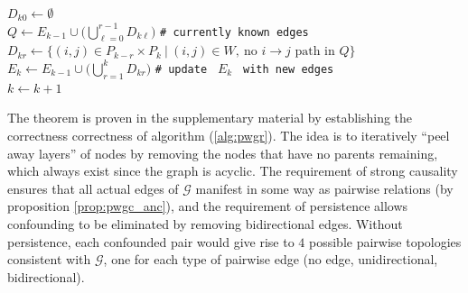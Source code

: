 \documentclass{statsoc}
\def\gcg{\mathcal{G}}  %
\begin{document}
\begin{algorithm}[H]
{    $D_{k0} \leftarrow \emptyset$\\
    {
      $Q \leftarrow E_{k - 1} \cup \big(\bigcup_{\ell = 0}^{r - 1} D_{k\ell}\big)$ \texttt{\# currently known edges}\\
      $D_{kr} \leftarrow \{(i, j) \in P_{k - r} \times P_k\ |\ (i, j) \in W,\ \text{no } i \rightarrow j \text{ path in } Q\}$
    }
    $E_k \leftarrow E_{k - 1} \cup \big(\bigcup_{r = 1}^k D_{kr}\big)$ \texttt{\# update } $E_k$ \texttt{ with new edges}\\
    $k \leftarrow k + 1$
  }
\end{algorithm}

The theorem is proven in the supplementary material by establishing
the correctness correctness of algorithm (\ref{alg:pwgr}).  The idea
is to iteratively ``peel away layers'' of nodes by removing the nodes
that have no parents remaining, which always exist since the graph is
acyclic.  The requirement of strong causality ensures that all actual
edges of $\gcg$ manifest in some way as pairwise relations (by
proposition \ref{prop:pwgc_anc}), and the requirement of persistence
allows confounding to be eliminated by removing bidirectional edges.
Without persistence, each confounded pair would give rise to $4$
possible pairwise topologies consistent with $\gcg$, one for each type
of pairwise edge (no edge, unidirectional, bidirectional).
\end{document}

